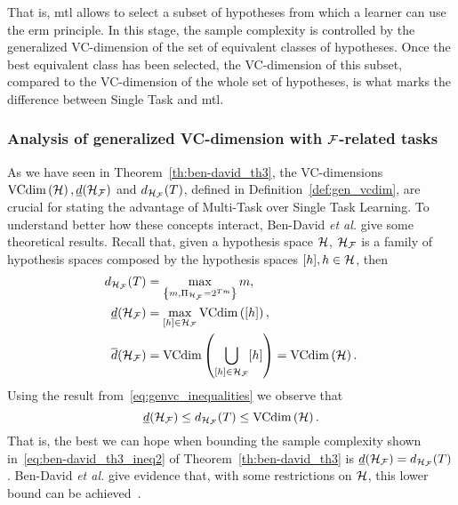 That is, \acrshort{mtl} allows to select a subset of hypotheses from which a learner can use the \acrshort{erm} principle. In this stage, the sample complexity is controlled by the generalized VC-dimension of the set of equivalent classes of hypotheses. Once the best equivalent class has been selected, 
the VC-dimension of this subset, compared to the VC-dimension of the whole set of hypotheses, is what marks the difference between Single Task and \acrshort{mtl}.

\subsubsection*{Analysis of generalized VC-dimension with $\mathcal{F}$-related tasks}
As we have seen in Theorem~\ref{th:ben-david_th3}, the VC-dimensions $\text{VCdim}\left(\mathcal{H}\right), \underline{d}(\mathcal{H}_{\mathcal{F}})$ and $d_{\mathcal{H}_{\mathcal{F}}}(T)$, defined in Definition~\ref{def:gen_vcdim}, are crucial for stating the advantage of Multi-Task over Single Task Learning. 
To understand better how these concepts interact, Ben-David \emph{et al.} give some theoretical results.
Recall that, given a hypothesis space $\mathcal{H}$, $\mathcal{H}_{\mathcal{F}}$ is a family of hypothesis spaces composed by the hypothesis spaces $\lbrack h\rbrack, h \in \mathcal{H}$, then
\begin{align*}
    \nonumber
    d_{\mathcal{H}_{\mathcal{F}}}(T) &= \max_{\left\{m ,\Pi_{\mathcal{H}_{\mathcal{F}}} = 2^{T m}\right\} } m, \\
    \underline{d}(\mathcal{H}_{\mathcal{F}}) &= \max_{\lbrack h\rbrack \in \mathcal{H}_{\mathcal{F}}} \text{VCdim}\left(\lbrack h\rbrack\right), \\    
    \overline{d}(\mathcal{H}_{\mathcal{F}}) &= \text{VCdim}\left(\bigcup_{\lbrack h\rbrack \in \mathcal{H}_{\mathcal{F}}} \lbrack h\rbrack\right)= \text{VCdim}\left(\mathcal{H}\right).
\end{align*}
Using the result from~\eqref{eq:genvc_inequalities} we observe that
\begin{equation}
    \nonumber
    \underline{d}(\mathcal{H}_{\mathcal{F}}) \leq d_{\mathcal{H}_{\mathcal{F}}}(T) \leq \text{VCdim}\left(\mathcal{H}\right) .
\end{equation}
That is, the best we can hope when bounding the sample complexity shown in~\eqref{eq:ben-david_th3_ineq2} of Theorem~\ref{th:ben-david_th3} is $\underline{d}(\mathcal{H}_{\mathcal{F}}) = d_{\mathcal{H}_{\mathcal{F}}}(T)$. 
Ben-David \emph{et al.} give evidence that, with some restrictions on $\mathcal{H}$, this lower bound can be achieved~\cite[Theorem~4]{Ben-DavidB08}.
